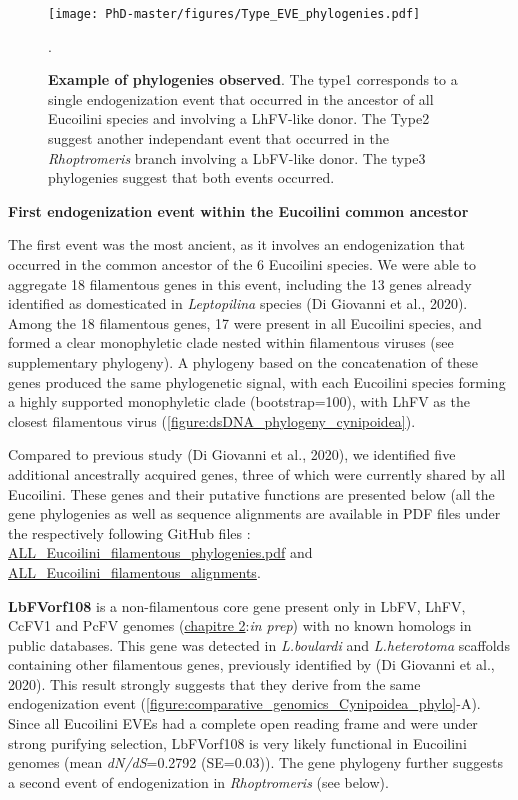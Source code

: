 \begin{figure}[!htpbt]
\texttt{[image: PhD-master/figures/Type\_EVE\_phylogenies.pdf]}\centering
\caption[Paper3:Type of Eucoilini EVE phylogenies]{\textbf{Example of phylogenies observed}. The type1 corresponds to a single endogenization event that occurred in the ancestor of all Eucoilini species and involving a LhFV-like donor. The Type2 suggest another independant event that occurred in the \textit{Rhoptromeris} branch involving a LbFV-like donor. The type3 phylogenies suggest that both events occurred.}.
\label{figure:Type_EVE_phylogenies}
\end{figure}


\textbf{First endogenization event within the Eucoilini common ancestor}

The first event was the most ancient, as it involves an endogenization that occurred in the common ancestor of the 6 Eucoilini species. We were able to aggregate 18 filamentous genes in this event, including the 13 genes already identified as domesticated in \textit{Leptopilina} species (Di Giovanni et al., 2020). Among the 18 filamentous genes, 17 were present in all Eucoilini species, and formed a clear monophyletic clade nested within filamentous viruses (see supplementary phylogeny). A phylogeny based on the concatenation of these genes produced the same phylogenetic signal, with each Eucoilini species forming a highly supported monophyletic clade (bootstrap=100), with LhFV as the closest filamentous virus (\figurename{\ref{figure:dsDNA_phylogeny_cynipoidea}}).  

Compared to previous study (Di Giovanni et al., 2020), we identified five additional ancestrally acquired genes, three of which were currently shared by all Eucoilini. These genes and their putative functions are presented below (all the gene phylogenies as well as sequence alignments are available in PDF files under the respectively following GitHub files : \href{https://github.com/BenjaminGuinet/PhD_defense/blob/main/Supplementary_paper3/ALL_Eucoilini_filamentous_phylogenies.pdf}{ALL\_Eucoilini\_filamentous\_phylogenies.pdf} and \href{https://github.com/BenjaminGuinet/PhD_defense/tree/main/Supplementary_paper3/All_Eucoilini_filamentous_alignments}{ALL\_Eucoilini\_filamentous\_alignments}.

\textbf{LbFVorf108} is a non-filamentous core gene present only in LbFV, LhFV, CcFV1 and PcFV genomes (\hyperref[sec:chap2]{chapitre 2}:\textit{in prep}) with no known homologs in public databases. This gene was detected in \textit{L.boulardi} and \textit{L.heterotoma} scaffolds containing other filamentous genes, previously identified by (Di Giovanni et al., 2020). This result strongly suggests that they derive from the same endogenization event (\figurename{\ref{figure:comparative_genomics_Cynipoidea_phylo}}-A). Since all Eucoilini EVEs had a complete open reading frame and were under strong purifying selection, LbFVorf108 is very likely functional in Eucoilini genomes (mean \textit{dN/dS}=0.2792 (SE=0.03)). The gene phylogeny further suggests a second event of endogenization in \textit{Rhoptromeris} (see below).\\

